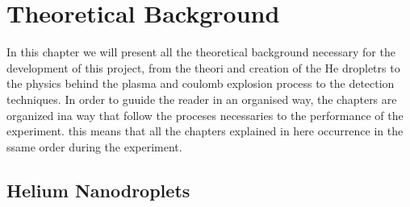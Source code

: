 


\chapter{Theoretical Background}

In this chapter we will present all the theoretical background necessary for the development of this project, from the theori and creation of the He dropletrs to the physics behind the plasma and coulomb explosion process to the detection techniques. In order to guuide the reader in an organised way, the chapters are organized ina way that follow the proceses necessaries to the performance of the experiment. this means that all the chapters explained in here occurrence in the ssame order during the experiment.


\section{Helium Nanodroplets}


